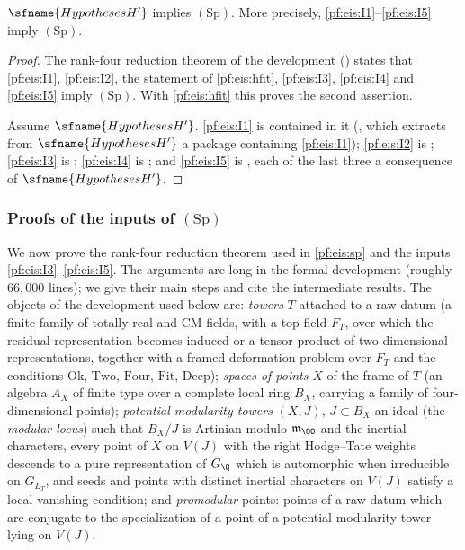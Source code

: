 \begin{theorem}\label{pf:eis:sp}
$\sfname{HypothesesH'}$ implies $(\mathrm{Sp})$. More precisely, \ref{pf:eis:I1}--\ref{pf:eis:I5} imply $(\mathrm{Sp})$.
\end{theorem}

\begin{proof}
The rank-four reduction theorem of the development () states that \ref{pf:eis:I1},
\ref{pf:eis:I2}, the statement of \cref{pf:eis:hfit}, \ref{pf:eis:I3}, \ref{pf:eis:I4} and \ref{pf:eis:I5} imply $(\mathrm{Sp})$. With
\cref{pf:eis:hfit} this proves the second assertion.

Assume $\sfname{HypothesesH'}$. \ref{pf:eis:I1} is contained in it (,
which extracts from $\sfname{HypothesesH'}$ a package containing \ref{pf:eis:I1}); \ref{pf:eis:I2} is
; \ref{pf:eis:I3} is ; \ref{pf:eis:I4} is
; and \ref{pf:eis:I5} is
, each of the last three a consequence of
$\sfname{HypothesesH'}$.
\end{proof}

\subsubsection{Proofs of the inputs of \texorpdfstring{$(\mathrm{Sp})$}{(Sp)}}

We now prove the rank-four reduction theorem used in \cref{pf:eis:sp} and the inputs \ref{pf:eis:I3}--\ref{pf:eis:I5}. The
arguments are long in the formal development (roughly $66{,}000$ lines); we give their main steps and cite the intermediate results.
The objects of the development used below are: \emph{towers} $T$ attached to a raw datum (a finite family of totally real and CM
fields, with a top field $F_T$, over which the residual representation becomes induced or a tensor product of two-dimensional
representations, together with a framed deformation problem over $F_T$ and the conditions $\mathrm{Ok}$, $\mathrm{Two}$,
$\mathrm{Four}$, $\mathrm{Fit}$, $\mathrm{Deep}$); \emph{spaces of points} $X$ of the frame of $T$ (an algebra $A_X$ of finite type over a
complete local ring $B_X$, carrying a family of four-dimensional points); \emph{potential modularity towers} $(X,J)$, $J\subset B_X$
an ideal (the \emph{modular locus}) such that $B_X/J$ is Artinian modulo $\mathfrak m_\OO$ and the inertial characters, every point of $X$ on
$V(J)$ with the right Hodge--Tate weights descends to a pure representation of $G_\Q$ which is automorphic when irreducible on
$G_{L_T}$, and seeds and points with distinct inertial characters on $V(J)$ satisfy a local vanishing condition; and \emph{promodular}
points: points of a raw datum which are conjugate to the specialization of a point of a potential modularity tower lying on $V(J)$.

